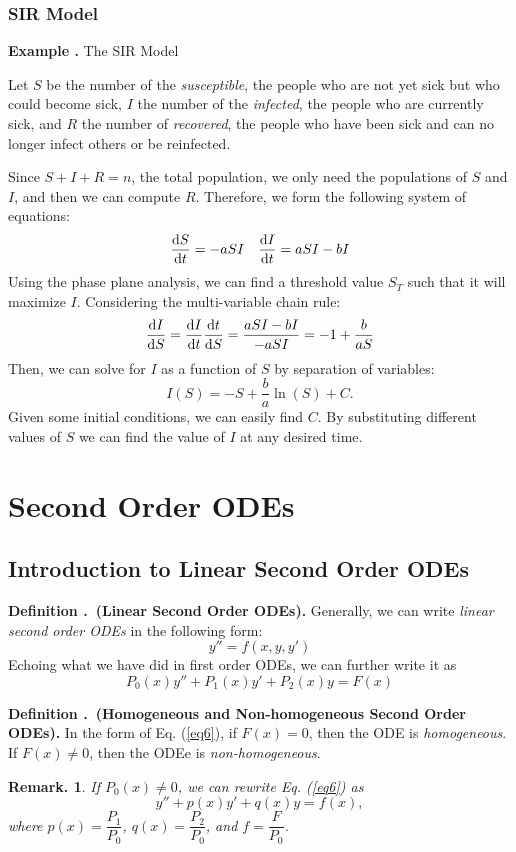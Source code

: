 \documentclass[12pt, a4paper]{article}
\newcounter{index}[subsection]
\newenvironment*{df}[1]{\par\noindent\textbf{Definition \thesubsection.\stepcounter{index}\theindex\ (#1).}}{\par}
\newenvironment*{eg}{\begin{framed}\par\noindent\textbf{Example \thesubsection.\stepcounter{index}\theindex}}{\par\end{framed}}
\newtheorem*{rmk}{Remark.}
\def\dsst{\displaystyle}
\begin{document}
\subsubsection{SIR Model}
\begin{eg}
	The SIR Model\par 
	Let $S$ be the number of the \textit{susceptible}, the people who are not yet sick but who could become sick, $I$ the number of the \textit{infected}, the people who are currently sick, and $R$ the number of \textit{recovered}, the people who have been sick and can no longer infect others or be reinfected.\par 
	Since $S+I+R=n$, the total population, we only need the populations of $S$ and $I$, and then we can compute $R$. Therefore, we form the following system of equations: 
	\[\dsst\dv{S}{t}=-aSI\quad \dv{I}{t}=aSI-bI\]
	Using the phase plane analysis, we can find a threshold value $S_T$ such that it will maximize $I$. Considering the multi-variable chain rule: \[\dv{I}{S}=\dv{I}{t}\dv{t}{S}=\dfrac{aSI-bI}{-aSI}=-1+\dfrac{b}{aS}\] Then, we can solve for $I$ as a function of $S$ by separation of variables: \[I(S)=-S+\dfrac{b}{a}\ln(S)+C.\] Given some initial conditions, we can easily find $C$. By substituting different values of $S$ we can find the value of $I$ at any desired time. 
\end{eg}


\newpage
\section{Second Order ODEs}
\subsection{Introduction to Linear Second Order ODEs}
\begin{df}{Linear Second Order ODEs}
	Generally, we can write \textit{linear second order ODEs} in the following form: \[y''=f(x,y,y')\] Echoing what we have did in first order ODEs, we can further write it as \begin{equation}\label{eq6}P_0(x)y''+P_1(x)y'+P_2(x)y=F(x)\end{equation}
\end{df}
\begin{df}{Homogeneous and Non-homogeneous Second Order ODEs}
	In the form of Eq. (\ref{eq6}), if $F(x)=0$, then the ODE is \textit{homogeneous}. If $F(x)\neq0$, then the ODEe is \textit{non-homogeneous}.
\end{df}
\begin{rmk}
	If $P_0(x)\neq0$, we can rewrite Eq. (\ref{eq6}) as \[y''+p(x)y'+q(x)y=f(x),\] where $p(x)=\dfrac{P_1}{P_0}$, $q(x)=\dfrac{P_2}{P_0}$, and $f=\dfrac{F}{P_0}$.
\end{rmk}
\end{document}
